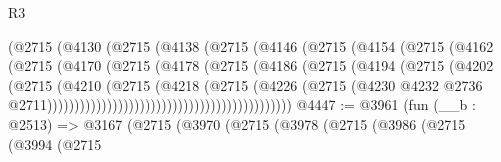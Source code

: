 \begin{lexlean}{R3}
\begin{coremodule}
                                      (@2715
                                        (@4130
                                          (@2715
                                            (@4138
                                              (@2715
                                                (@4146
                                                  (@2715
                                                    (@4154
                                                      (@2715
                                                        (@4162
                                                          (@2715
                                                            (@4170
                                                              (@2715
                                                                (@4178
                                                                  (@2715
                                                                    (@4186
                                                                      (@2715
                                                                        (@4194
                                                                          (@2715
                                                                            (@4202
                                                                              (@2715
                                                                                (@4210
                                                                                  (@2715
                                                                                    (@4218
                                                                                      (@2715
                                                                                        (@4226
                                                                                          (@2715
                                                                                            (@4230
                                                                                              @4232
                                                                                              @2736
                                                                                              @2711)))))))))))))))))))))))))))))))))))))))))))))
@4447 := @3961
    (fun (__b : @2513) =>
    @3167
      (@2715
        (@3970
          (@2715
            (@3978
              (@2715
                (@3986
                  (@2715
                    (@3994
                      (@2715

\end{coremodule}
\end{lexlean}
